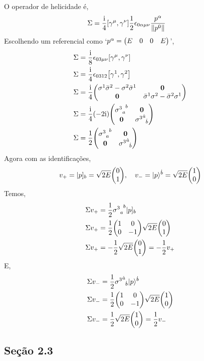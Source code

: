 O operador de helicidade é,
\begin{align*}
    \Sigma&=\frac\im4\comm{\gamma^\mu}{\gamma^\nu}\frac12\epsilon_{0\alpha\mu\nu}\frac{p^\alpha}{\norm{p^0}}
\end{align*}
Escolhendo um referencial como `$p^\alpha=\mqty(E&0&0&E)$',
\begin{align*}
    \Sigma&=\frac\im8\epsilon_{03\mu\nu}\comm{\gamma^\mu}{\gamma^\nu}\\
    \Sigma&=\frac\im4\epsilon_{0312}\comm{\gamma^1}{\gamma^2}\\
    \Sigma&=\frac\im4\mqty(\sigma^1{\bar\sigma}^2-\sigma^2{\bar\sigma}^1&\vb 0\\\vb 0&{\bar\sigma}^1\sigma^2-{\bar\sigma}^2\sigma^1)\\
    \Sigma&=\frac\im4\qty(-2\im)\mqty(\tensor{{\sigma^3}}{_a^b}&\vb 0\\\vb 0&\tensor{{\sigma^3}}{^{\dot a}_{\dot b}})\\
    \Sigma&=\frac12\mqty(\tensor{{\sigma^3}}{_a^b}&\vb 0\\\vb 0&\tensor{{\sigma^3}}{^{\dot a}_{\dot b}})
\end{align*}
Agora com as identificações,
\[v_+=|p]_b=\sqrt{2E}\mqty(0\\1),\ \ \ v_-=|p\rangle^{\dot b}=\sqrt{2E}\mqty(1\\0)\]
Temos,
\begin{align*}
    \Sigma v_+&=\frac12\tensor{{\sigma^3}}{_a^b}|p]_b\\
    \Sigma v_+&=\frac12\mqty(1&0\\0&-1)\sqrt{2E}\mqty(0\\1)\\
    \Sigma v_+&=-\frac12\sqrt{2E}\mqty(0\\1)=-\frac12v_+\\
\end{align*}
E,
\begin{align*}
    \Sigma v_-&=\frac12\tensor{{\sigma^3}}{^{\dot a}_{\dot b}}|p\rangle^{\dot b}\\
    \Sigma v_-&=\frac12\mqty(1&0\\0&-1)\sqrt{2E}\mqty(1\\0)\\
    \Sigma v_-&=\frac12\sqrt{2E}\mqty(1\\0)=\frac12v_-\\
\end{align*}

\subsection{Seção 2.3}